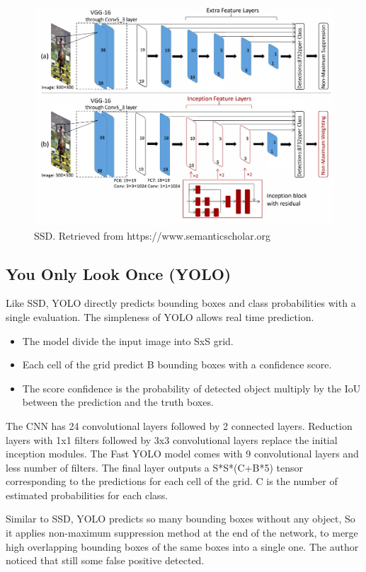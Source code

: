 \documentclass[12pt]{report}
\begin{document}
\begin{figure}[h]
    \centering
    \includegraphics[width=.8\textwidth]{./images/ssd.png}
    \caption{SSD. Retrieved from https://www.semanticscholar.org}
    \label{fig:frcnn}
\end{figure} 



\subsection{You Only Look Once (YOLO)}

Like SSD, YOLO directly predicts bounding boxes and class probabilities
with a single evaluation. The simpleness of YOLO allows real time prediction.
\begin{itemize}
    \item The model divide the input image into SxS grid.
    \item Each cell of the grid predict B bounding boxes with a confidence score.
    \item The score confidence is the probability of detected object multiply by the IoU between the prediction and the truth boxes.
\end{itemize}
The CNN has 24 convolutional layers followed by 2 connected layers.
Reduction layers with 1x1 filters followed by 3x3 convolutional layers 
replace the initial inception modules.
\bigbreak
The Fast YOLO model comes with 9  convolutional layers and less number of filters.
The final layer outputs a S*S*(C+B*5) tensor corresponding to the predictions for each cell of the grid.
C is the number of estimated probabilities for each class.

Similar to SSD, YOLO predicts so many bounding boxes without any object,
So it applies non-maximum suppression method at the end of the network,
to merge high overlapping bounding boxes of the same boxes into a single one.
The author noticed that still some false positive detected.\cite{Redmon2016}
\end{document}
